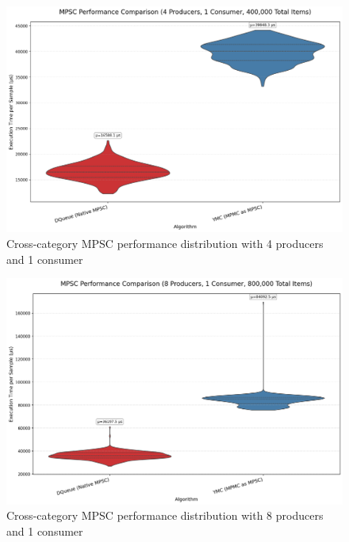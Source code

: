 \begin{figure}[H]
\centering
\caption{Cross-category MPSC performance distribution with 4 producers and 1 consumer}
\label{fig:cross-mpsc-violin-4p}
\includegraphics[width=\textwidth]{images/results/best_in_mpsc_performance_violin_4P1C.png}
\end{figure}

\begin{figure}[H]
\centering
\caption{Cross-category MPSC performance distribution with 8 producers and 1 consumer}
\label{fig:cross-mpsc-violin-8p}
\includegraphics[width=\textwidth]{images/results/best_in_mpsc_performance_violin_8P1C.png}
\end{figure}

